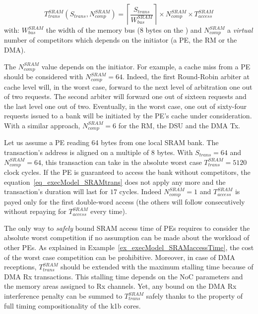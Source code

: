 \documentclass[main.tex]{subfiles}
\begin{document}
\begin{equation}
    \label{eq_execModel_SRAMtrans}
    T_{trans}^{SRAM} ( S_{trans} , N_{comp}^{SRAM} ) = \left\lceil \dfrac{S_{trans}}{W_{bus}^{SRAM}} \right\rceil \times N_{comp}^{SRAM} \times T_{access}^{SRAM}
\end{equation}
with: $W_{bus}^{SRAM}$ the width of the memory bus (8 bytes on the \mppalong) and $N_{comp}^{SRAM}$ a \emph{virtual} number of competitors which depends on the initiator (a PE, the RM or the DMA).

The $N_{comp}^{SRAM}$ value depends on the initiator. For example, a cache miss from a PE should be considered with $N_{comp}^{SRAM} = 64$. Indeed, the first Round-Robin arbiter at cache level will, in the worst case, forward to the next level of arbitration one out of two requests. The second arbiter will forward one out of sixteen requests and the last level one out of two. Eventually, in the worst case, one out of sixty-four requests issued to a bank will be initiated by the PE's cache under consideration. With a similar approach, $N_{comp}^{SRAM} = 6$ for the RM, the DSU and the DMA Tx.

\begin{example}
    \label{ex_execModel_SRAMaccessTime}
    Let us assume a PE reading 64 bytes from one local SRAM bank. The transaction's address is aligned on a multiple of 8 bytes. With $S_{trans} = 64$ and $N_{comp}^{SRAM} = 64$, this transaction can take in the absolute worst case $T_{trans}^{SRAM} = 5120$ clock cycles. If the PE is guaranteed to access the bank without competitors, the equation~\ref{eq_execModel_SRAMtrans} does not apply any more and the transaction's duration will last for $17$ cycles. Indeed $N_{comp}^{SRAM}=1$ and $T_{access}^{SRAM}$ is payed only for the first double-word access (the others will follow consecutively without repaying for $T_{access}^{SRAM}$ every time).
\end{example}

The only way to \emph{safely} bound SRAM access time of PEs requires to consider the absolute worst competition if no assumption can be made about the workload of other PEs. As explained in Example~\ref{ex_execModel_SRAMaccessTime}, the cost of the worst case competition can be prohibitive. 
Moreover, in case of DMA receptions, $T_{trans}^{SRAM}$ should be extended with the maximum stalling time because of DMA Rx transactions. This stalling time depends on the NoC parameters and the memory areas assigned to Rx channels. Yet, any bound on the DMA Rx interference penalty can be summed to $T_{trans}^{SRAM}$ safely thanks to the property of full timing compositionality of the k1b cores.
\end{document}
